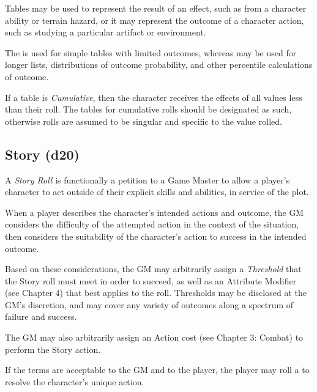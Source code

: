 \vspace{0.4em}

Tables may be used to represent the result of an effect, 
such as from a character ability or terrain hazard,
or it may represent the outcome of a character action, 
such as studying a particular artifact or environment.

\vspace{0.4em}

The  is used for simple tables with limited outcomes, 
whereas  may be used for longer lists,
distributions of outcome probability, 
and other percentile calculations of outcome.

\vspace{0.4em}

If a table is \textit{Cumulative}, 
then the character receives the effects of all values less than their roll.
The tables for cumulative rolls should be designated as such, 
otherwise rolls are assumed to be singular and specific to the value rolled.


\subsection{Story (d20)}
A \textit{Story Roll} is functionally a petition to a Game Master 
to allow a player's character to act outside of their explicit 
skills and abilities, in service of the plot.

\vspace{0.4em}

When a player describes the character's intended actions and outcome,
the GM considers the difficulty of the attempted action in the context 
of the situation,
then considers the suitability of the character's action 
to success in the intended outcome.

\vspace{0.4em}

Based on these considerations, 
the GM may arbitrarily assign a \textit{Threshold} 
that the Story roll must meet in order to succeed,
as well as an Attribute Modifier (see Chapter 4) 
that best applies to the roll.
Thresholds may be disclosed at the GM's discretion, 
and may cover any variety of outcomes along a spectrum of failure and success.

\vspace{0.4em}

The GM may also arbitrarily assign an Action cost (see Chapter 3: Combat)
to perform the Story action.

\vspace{0.4em}

If the terms are acceptable to the GM and to the player, 
the player may roll a  to resolve the character's unique action.

